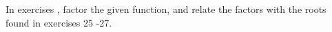 {\noindent In exercises}
{, factor the given function, and relate the factors with the roots found in exercises 25 -27.}
